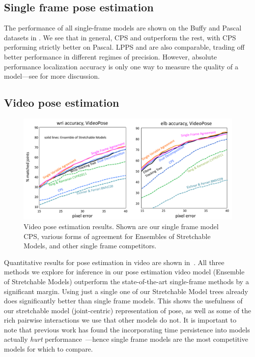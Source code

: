 \subsection{Single frame pose estimation}
The performance of all single-frame models are shown on the Buffy and Pascal 
datasets in .  We see that in general, CPS and 
\citet{deva2011} outperform the rest, with CPS performing strictly better on 
Pascal.  LPPS and \citet{eichner09} are also comparable, trading off better 
performance in different regimes of precision.   However, absolute performance 
localization accuracy is only one way to measure the quality of a model---see 
 for more discussion.


\subsection{Video pose estimation}
\begin{figure}[tb]
\begin{center}
\includegraphics[width=1.00\textwidth]{figs/results-vpose.pdf}
\caption[Video pose estimation results.]{Video pose estimation results.  Shown 
are our single frame model CPS, various forms of agreement for Ensembles of 
Stretchable Models, and other single frame competitors.}
\label{fig:results-vpose}
\end{center}
\end{figure}

Quantitative results for pose estimation in video are shown 
in~.  All three methods we explore for inference in our 
pose estimation video model (Ensemble of Stretchable Models) outperform the 
state-of-the-art single-frame methods by a significant margin.  Using just a 
single one of our Stretchable Model trees already does significantly better 
than single frame models.  This shows the usefulness of our stretchable model 
(joint-centric) representation of pose, as well as some of the rich pairwise 
interactions we use that other models do not.  It is important to note that 
previous work has found the incorporating time persistence into models actually 
{\em hurt } performance~\citep{posesearch,weisssapp10}---hence single frame 
models are the most competitive models for which to compare.

